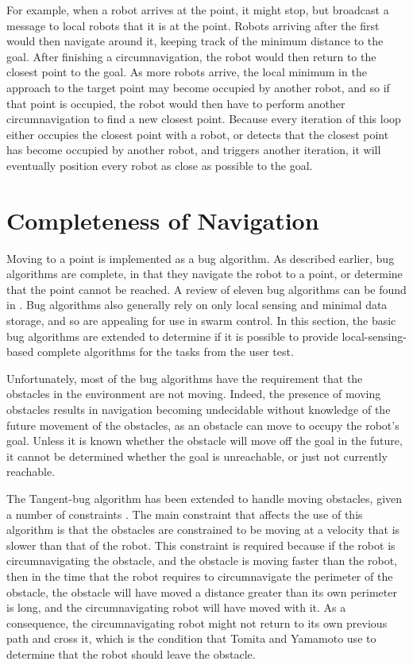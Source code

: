 For example, when a robot arrives at the point, it might stop, but broadcast a message to local robots that it is at the point. 
Robots arriving after the first would then navigate around it, keeping track of the minimum distance to the goal. 
After finishing a circumnavigation, the robot would then return to the closest point to the goal. 
As more robots arrive, the local minimum in the approach to the target point may become occupied by another robot, and so if that point is occupied, the robot would then have to perform another circumnavigation to find a new closest point. 
Because every iteration of this loop either occupies the closest point with a robot, or detects that the closest point has become occupied by another robot, and triggers another iteration, it will eventually position every robot as close as possible to the goal. 

\section{Completeness of Navigation}

Moving to a point is implemented as a bug algorithm. As described earlier, bug algorithms are complete, in that they navigate the robot to a point, or determine that the point cannot be reached. A review of eleven bug algorithms can be found in \citep{ng2007performance}. 
Bug algorithms also generally rely on only local sensing and minimal data storage, and so are appealing for use in swarm control. 
In this section, the basic bug algorithms are extended to determine if it is possible to provide local-sensing-based complete algorithms for the tasks from the user test. 

Unfortunately, most of the bug algorithms have the requirement that the obstacles in the environment are not moving.
Indeed, the presence of moving obstacles results in navigation becoming undecidable without knowledge of the future movement of the obstacles, as an obstacle can move to occupy the robot's goal. 
Unless it is known whether the obstacle will move off the goal in the future, it cannot be determined whether the goal is unreachable, or just not currently reachable. 

The Tangent-bug algorithm has been extended to handle moving obstacles, given a number of constraints \citep{kamon1998tangentbug, tomita2009sensor}.
The main constraint that affects the use of this algorithm is that the obstacles are constrained to be moving at a velocity that is slower than that of the robot.
This constraint is required because if the robot is circumnavigating the obstacle, and the obstacle is moving faster than the robot, then in the time that the robot requires to circumnavigate the perimeter of the obstacle, the obstacle will have moved a distance greater than its own perimeter is long, and the circumnavigating robot will have moved with it.
As a consequence, the circumnavigating robot might not return to its own previous path and cross it, which is the condition that Tomita and Yamamoto use to determine that the robot should leave the obstacle. 


